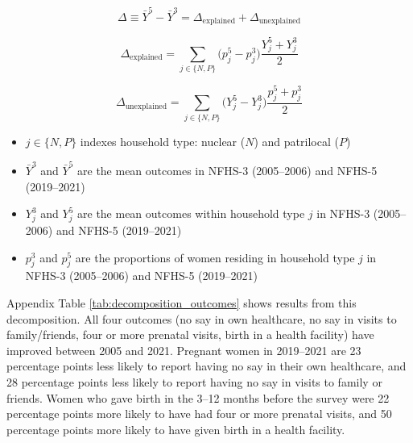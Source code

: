 \documentclass[10pt,twoside,reqno]{article}
\begin{document}
\begin{equation}
\Delta \equiv \bar Y^{5} - \bar Y^{3}
= \Delta_{\text{explained}} + \Delta_{\text{unexplained}}
\end{equation}

\begin{equation}
\Delta_{\text{explained}} =
\sum_{j \in \{N,P\}} \big(p_j^{5} - p_j^{3}\big)\frac{Y_j^{5} + Y_j^{3}}{2}
\end{equation}

\begin{equation}
\Delta_{\text{unexplained}} =
\sum_{j \in \{N,P\}} \big(Y_j^{5} - Y_j^{3}\big)\frac{p_j^{5} + p_j^{3}}{2}
\end{equation}

\begin{itemize}
    \item $j \in \{N,P\}$ indexes household type: nuclear ($N$) and patrilocal ($P$)
    \item $\bar Y^{3}$ and $\bar Y^{5}$ are the mean outcomes in NFHS-3 (2005--2006) and NFHS-5 (2019--2021)
    \item $Y_j^{3}$ and $Y_j^{5}$ are the mean outcomes within household type $j$ in NFHS-3 (2005--2006) and NFHS-5 (2019--2021)
    \item $p_j^{3}$ and $p_j^{5}$ are the proportions of women residing in household type $j$ in NFHS-3 (2005--2006) and NFHS-5 (2019--2021)
\end{itemize}


Appendix Table \ref{tab:decomposition_outcomes} shows results from this decomposition. All four outcomes (no say in own healthcare, no say in visits to family/friends, four or more prenatal visits, birth in a health facility) have improved between 2005 and 2021. Pregnant women in 2019--2021 are 23 percentage points less likely to report having no say in their own healthcare, and 28 percentage points less likely to report having no say in visits to family or friends. Women who gave birth in the 3--12 months before the survey were 22 percentage points more likely to have had four or more prenatal visits, and 50 percentage points more likely to have given birth in a health facility. 
\end{document}
